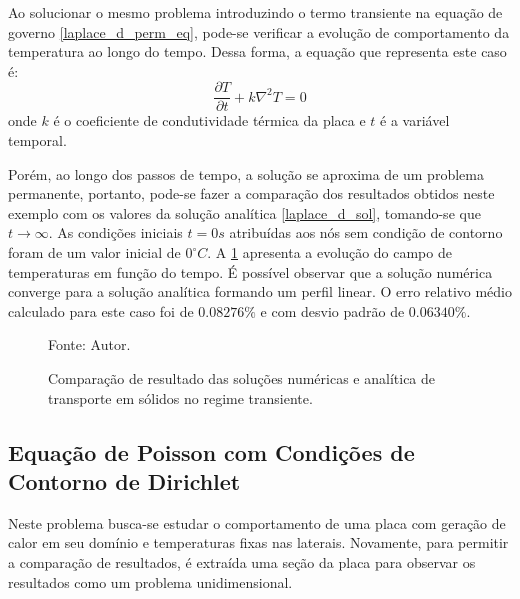 Ao solucionar o mesmo problema introduzindo o termo transiente na equação de governo \ref{laplace_d_perm_eq}, pode-se verificar a evolução de comportamento da temperatura ao longo do tempo.
Dessa forma, a equação que representa este caso é:
\begin{equation}
    \dfrac{\partial T}{\partial t} + k\nabla^2 T = 0
    \label{laplace_d_trans_eq} 
\end{equation}
onde $k$ é o coeficiente de condutividade térmica da placa e $t$ é a variável temporal.

Porém, ao longo dos passos de tempo, a solução se aproxima de um problema permanente, portanto, pode-se fazer a comparação dos resultados obtidos neste exemplo com os valores da solução analítica \eqref{laplace_d_sol}, tomando-se que $t\rightarrow \infty$.
As condições iniciais $t=0s$ atribuídas aos nós sem condição de contorno foram de um valor inicial de $0^{\circ}C$.
A \ref{laplace_d_trans_comp} apresenta a evolução do campo de temperaturas em função do tempo.
É possível observar que a solução numérica converge para a solução analítica formando um perfil linear.
O erro relativo médio calculado para este caso foi de $0.08276\%$ e com desvio padrão de $0.06340\%$.
\begin{figure}[H]
    \centering
     {\raggedleft \scriptsize Fonte: Autor.}
    \caption{Comparação de resultado das soluções numéricas e analítica de transporte em sólidos no regime transiente.}
    \label{laplace_d_trans_comp}
\end{figure}


\subsection{\textbf{Equação de Poisson com Condições de Contorno de Dirichlet}}
\label{sec_poisson_dir}
Neste problema busca-se estudar o comportamento de uma placa com geração de calor em seu domínio e temperaturas fixas nas laterais.
Novamente, para permitir a comparação de resultados, é extraída uma seção da placa para observar os resultados como um problema unidimensional.

